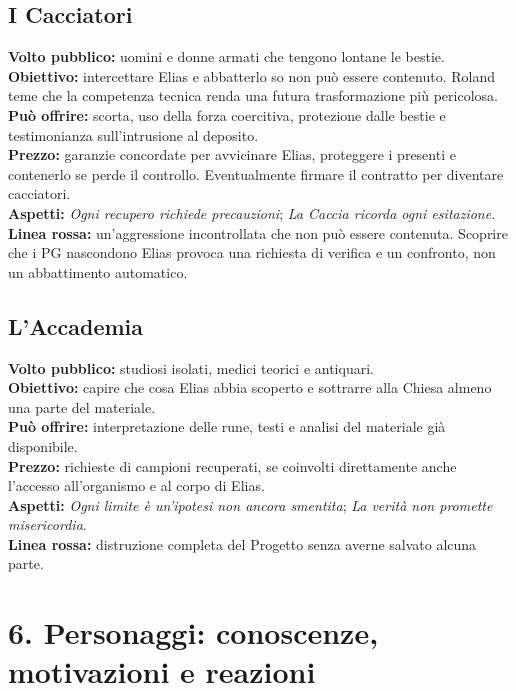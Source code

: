 \documentclass[11pt,a4paper]{article}
\newcommand{\aspect}[1]{\textit{\textcolor{blood}{#1}}}
\begin{document}
\subsection{I Cacciatori}
\textbf{Volto pubblico:} uomini e donne armati che tengono lontane le bestie.\\
\textbf{Obiettivo:} intercettare Elias e abbatterlo so non può essere contenuto. Roland teme che la competenza tecnica renda una futura trasformazione più pericolosa.\\
\textbf{Può offrire:} scorta, uso della forza coercitiva, protezione dalle bestie e testimonianza sull'intrusione al deposito.\\
\textbf{Prezzo:} garanzie concordate per avvicinare Elias, proteggere i presenti e contenerlo se perde il controllo. Eventualmente firmare il contratto per diventare cacciatori.\\
\textbf{Aspetti:} \aspect{Ogni recupero richiede precauzioni}; \aspect{La Caccia ricorda ogni esitazione}.\\
\textbf{Linea rossa:} un'aggressione incontrollata che non può essere contenuta. Scoprire che i PG nascondono Elias provoca una richiesta di verifica e un confronto, non un abbattimento automatico.

\subsection{L'Accademia}
\textbf{Volto pubblico:} studiosi isolati, medici teorici e antiquari.\\
\textbf{Obiettivo:} capire che cosa Elias abbia scoperto e sottrarre alla Chiesa almeno una parte del materiale.\\
\textbf{Può offrire:} interpretazione delle rune, testi e analisi del materiale già disponibile.\\
\textbf{Prezzo:} richieste di campioni recuperati, se coinvolti direttamente anche l'accesso all'organismo e al corpo di Elias.\\
\textbf{Aspetti:} \aspect{Ogni limite è un'ipotesi non ancora smentita}; \aspect{La verità non promette misericordia}.\\
\textbf{Linea rossa:} distruzione completa del Progetto senza averne salvato alcuna parte.

\section{6. Personaggi: conoscenze, motivazioni e reazioni}
\end{document}
